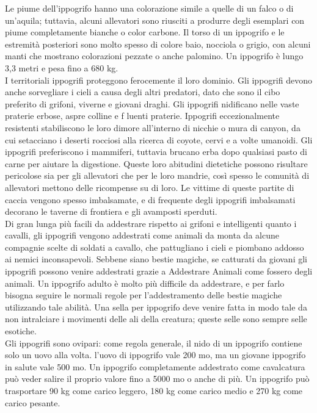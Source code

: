 \begin{multicols}{2}
Le piume dell'ippogrifo hanno una colorazione simile a quelle di un falco o di un'aquila; tuttavia, alcuni allevatori sono riusciti a produrre degli esemplari con piume completamente bianche o color carbone. Il torso di un ippogrifo e le estremità posteriori sono molto spesso di colore baio, nocciola o grigio, con alcuni manti che mostrano colorazioni pezzate o anche palomino. Un ippogrifo è lungo 3,3 metri e pesa fino a 680 kg.\\

I territoriali ippogrifi proteggono ferocemente il loro dominio. Gli ippogrifi devono anche sorvegliare i cieli a causa degli altri predatori, dato che sono il cibo preferito di grifoni, viverne e giovani draghi. Gli ippogrifi nidificano nelle vaste praterie erbose, aspre colline e f luenti praterie. Ippogrifi eccezionalmente resistenti stabiliscono le loro dimore all'interno di nicchie o mura di canyon, da cui setacciano i deserti rocciosi alla ricerca di coyote, cervi e a volte umanoidi. Gli ippogrifi preferiscono i mammiferi, tuttavia brucano erba dopo qualsiasi pasto di carne per aiutare la digestione. Queste loro abitudini dietetiche possono risultare pericolose sia per gli allevatori che per le loro mandrie, così spesso le comunità di allevatori mettono delle ricompense su di loro. Le vittime di queste partite di caccia vengono spesso imbalsamate, e di frequente degli ippogrifi imbalsamati decorano le taverne di frontiera e gli avamposti sperduti.\\

Di gran lunga più facili da addestrare rispetto ai grifoni e intelligenti quanto i cavalli, gli ippogrifi vengono addestrati come animali da monta da alcune compagnie scelte di soldati a cavallo, che pattugliano i cieli e piombano addosso ai nemici inconsapevoli. Sebbene siano bestie magiche, se catturati da giovani gli ippogrifi possono venire addestrati grazie a Addestrare Animali come fossero degli animali. Un ippogrifo adulto è molto più difficile da addestrare, e per farlo bisogna seguire le normali regole per l'addestramento delle bestie magiche utilizzando tale abilità. Una sella per ippogrifo deve venire fatta in modo tale da non intralciare i movimenti delle ali della creatura; queste selle sono sempre selle esotiche.\\

Gli ippogrifi sono ovipari: come regola generale, il nido di un ippogrifo contiene solo un uovo alla volta. l'uovo di ippogrifo vale 200 mo, ma un giovane ippogrifo in salute vale 500 mo. Un ippogrifo completamente addestrato come cavalcatura può veder salire il proprio valore fino a 5000 mo o anche di più. Un ippogrifo può trasportare 90 kg come carico leggero, 180 kg come carico medio e 270 kg come carico pesante.\\


\end{multicols}
